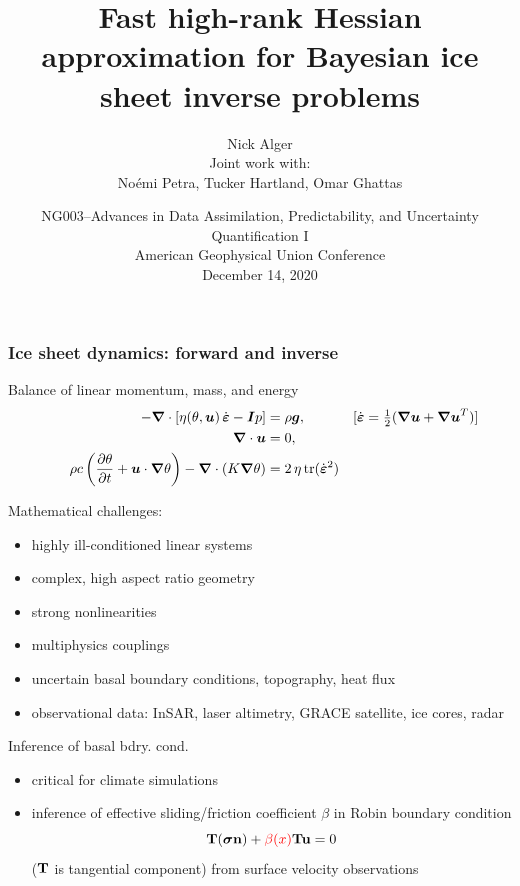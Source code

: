 \documentclass[10pt,final,xcolor=dvipsnames]{beamer}
\title[]{Fast high-rank Hessian approximation for Bayesian ice sheet
  inverse problems}
\author[Nick Alger]{{Nick Alger}\inst{1}\\[2ex]
  {\small \textcolor{themec}{Joint work with:}}
  \\
  {\small No\'{e}mi Petra},\inst{2}
  {\small Tucker Hartland},\inst{2}
  {\small Omar Ghattas\inst{1}}}
\institute[UCM]{%
  \inst{1}{Oden Institute\\
    The University of Texas at Austin}\\\smallskip
  \inst{2}{Applied Mathematics, School of Natural Sciences\\
    University of California, Merced}\\\smallskip
}
\date[December 14, 2020]{%
  \footnotesize
  NG003--Advances in Data Assimilation, Predictability, and Uncertainty Quantification I\\
  American Geophysical Union Conference\\
  December 14, 2020}
\newcommand{\gbf}[1]{\boldsymbol{#1}}
\newcommand{\bs}[1]{\ensuremath{\boldsymbol{#1}}}
\newcommand{\edot}{\dot{\gbf{\varepsilon}}}
\newcommand{\tcr}[1]{\ensuremath{\textcolor{red}{{#1}}}}
\begin{document}
\begin{frame}[plain]
  \titlepage
\end{frame}
\begin{frame}
\frametitle{Ice sheet dynamics: forward and inverse}

\begin{block}{Balance of linear momentum, mass, and energy}
  \[
  \begin{aligned}
    - \gbf{\nabla} \cdot \left[ \eta(\theta,\gbf{u}) \, \edot
      -\gbf{I}p \right] &= \rho \gbf{g},
    &[\edot = \tfrac 12  (\gbf{\nabla u} + \gbf{\nabla  u}^T)]
    \hspace{-2em}
    \\
    \gbf{\nabla} \cdot \gbf{u} &= 0,
    \vspace{-2em} \\
    \rho c \left(\frac{\partial \theta}{\partial t} + \gbf{u} \cdot \gbf{\nabla}
    \theta\right)  - \gbf{\nabla} \cdot (K \gbf{\nabla} \theta)
    &= 2 \, \eta \, \mathrm{tr}(\edot^2)
  \end{aligned}
  \]
\end{block}
\vspace{0.2cm}
\begin{minipage}{.49\columnwidth}
  \alert{Mathematical challenges:}
  \begin{itemize}
    \small
  \item highly ill-conditioned linear systems
  \item complex, high aspect ratio geometry
  \item strong nonlinearities
  \item multiphysics couplings
  \item uncertain \alert{basal boundary conditions}, topography,
    heat flux
  \item observational data: InSAR, laser altimetry, GRACE
    satellite, ice cores, radar
  \end{itemize}
\end{minipage}
\begin{minipage}{.48\columnwidth}
  \alert{Inference of basal bdry. cond.}
  \begin{itemize}
    \small
  \item critical for climate simulations %
  \item inference of effective sliding/friction coefficient $\beta$ in
    Robin boundary condition
    \begin{equation*}
      {\bf T}(\bs \sigma {\bf n}) + \tcr{\beta (x)}{\bf T}{\bf u} = 0
    \end{equation*}
    ($\bf T$ is tangential component)  from
    surface velocity observations
  \end{itemize}
\end{minipage}
\end{frame}
\end{document}

